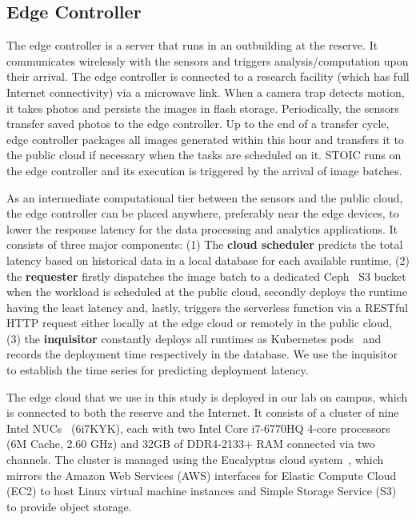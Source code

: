 \subsection{Edge Controller} 

The edge controller is a server that runs in an
outbuilding at the reserve. It communicates wirelessly with the sensors and
triggers analysis/computation upon their arrival. The edge controller is
connected to a research facility (which has full Internet connectivity) 
via a microwave link. When a camera trap detects
motion, it takes photos and persists the images in flash storage.
Periodically, the sensors transfer saved photos to the edge controller. Up to
the end of a transfer cycle, edge controller packages all images generated
within this hour and transfers it to the public cloud if necessary when the
tasks are scheduled on it. STOIC runs on the edge controller and its execution
is triggered by the arrival of image batches. 

As an intermediate computational tier between the sensors and the public
cloud, the edge controller can be placed anywhere, preferably near the edge
devices, to lower the response latency for the data processing and analytics
applications. It consists of three major components: (1) The \textbf{cloud
scheduler} predicts the total latency based on historical data in a local
database for each available runtime, (2) the \textbf{requester} firstly
dispatches the image batch to a dedicated Ceph~\cite{ref:ceph} S3 bucket when
the workload is scheduled at the public cloud, secondly deploys the runtime
having the least latency and, lastly, triggers the  serverless function via a
RESTful HTTP request either locally at the edge cloud or remotely in the
public cloud, (3) the \textbf{inquisitor} constantly deploys all runtimes as
Kubernetes pods~\cite{ref:pods} and records the deployment time respectively
in the database. We use the inquisitor to establish the time series for
predicting deployment latency.

The edge cloud that we use in this study is deployed in our lab on campus,
which is connected to both the reserve and the Internet. It consists of a
cluster of nine Intel NUCs~\cite{ref:nucs} (6i7KYK), each with two Intel Core
i7-6770HQ 4-core processors (6M Cache, 2.60 GHz) and 32GB of DDR4-2133+ RAM
connected via two channels. The cluster is managed using the Eucalyptus cloud
system~\cite{ref:euca}, which mirrors the Amazon Web Services (AWS) interfaces
for Elastic Compute Cloud (EC2) to host Linux virtual machine instances and
Simple Storage Service (S3) to provide object storage.
 
